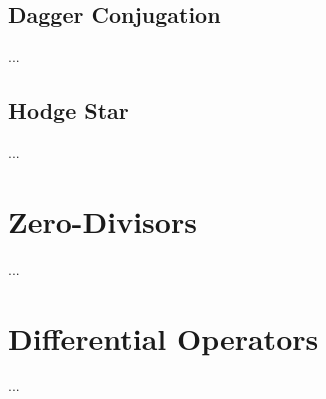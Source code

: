 \subsection{Dagger Conjugation}
...
\subsection{Hodge Star}
...
\section{Zero-Divisors}
...
\section{Differential Operators}
...